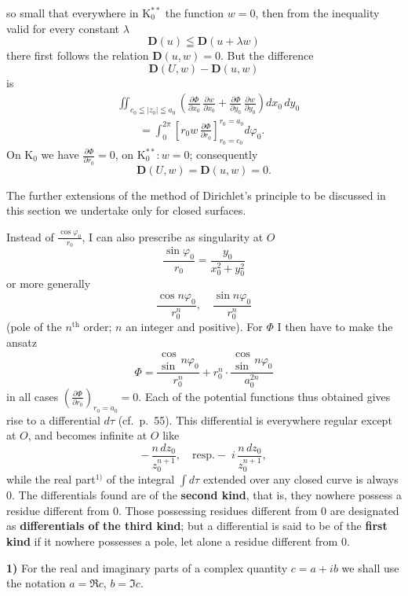 \documentclass{article}
\begin{document}
so small that everywhere in $\mathrm{K}_0^{**}$ the function $w = 0$, then from the inequality valid for every constant $\lambda$
\[ \mathbf{D}(u) \leqq \mathbf{D}(u + \lambda w) \]
there first follows the relation $\mathbf{D}(u, w) = 0$. But the difference
\[ \mathbf{D}(U, w) - \mathbf{D}(u, w) \]
is
\[ \begin{aligned}
&\iint_{c_0 \leqq |z_0| \leqq a_0} \left( \frac{\partial\Phi}{\partial x_0}\,\frac{\partial w}{\partial x_0} + \frac{\partial\Phi}{\partial y_0}\,\frac{\partial w}{\partial y_0} \right) dx_0\,dy_0 \\
&\qquad = \int_0^{2\pi} \left[ r_0 w\,\frac{\partial\Phi}{\partial r_0} \right]_{r_0 = c_0}^{r_0 = a_0} d\varphi_0.
\end{aligned} \]
On $\mathrm{K}_0$ we have $\frac{\partial\Phi}{\partial r_0} = 0$, on $\mathrm{K}_0^{**}\colon w = 0$; consequently
\[ \mathbf{D}(U, w) = \mathbf{D}(u, w) = 0. \]

The further extensions of the method of Dirichlet's principle to be discussed in this section we undertake only for closed surfaces.

Instead of $\frac{\cos\varphi_0}{r_0}$, I can also prescribe as singularity at $O$
\[ \frac{\sin\varphi_0}{r_0} = \frac{y_0}{x_0^2 + y_0^2} \]
or more generally
\[ \frac{\cos n\varphi_0}{r_0^n}, \quad \frac{\sin n\varphi_0}{r_0^n} \]
(pole of the $n^{\text{th}}$ order; $n$ an integer and positive). For $\Phi$ I then have to make the ansatz
\[ \Phi = \frac{\substack{\cos\\\sin} n\varphi_0}{r_0^n} + r_0^n \cdot \frac{\substack{\cos\\\sin} n\varphi_0}{a_0^{2n}} \]
in all cases $\left(\frac{\partial\Phi}{\partial r_0}\right)_{r_0 = a_0} = 0$. Each of the potential functions thus obtained gives rise to a differential $d\tau$ (cf.\ p.~55). This differential is everywhere regular except at $O$, and becomes infinite at $O$ like
\[ -\,\frac{n\,dz_0}{z_0^{n+1}}, \quad \text{resp.} -\; i\,\frac{n\,dz_0}{z_0^{n+1}}, \]
while the real part${}^{1)}$ of the integral $\displaystyle\int d\tau$ extended over any closed curve is always $0$. The differentials found are of the \textbf{second kind}, that is, they nowhere possess a residue different from $0$. Those possessing residues different from $0$ are designated as \textbf{differentials of the third kind}; but a differential is said to be of the \textbf{first kind} if it nowhere possesses a pole, let alone a residue different from $0$.

\textbf{1)} For the real and imaginary parts of a complex quantity $c = a + ib$ we shall use the notation $a = \Re c$, $b = \Im c$.
\end{document}
